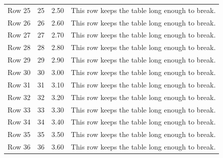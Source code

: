 \begin{tabularx}{\textwidth}{| l | c | r | L |}
	Row 25 & 25 & 2.50 & This row keeps the table long enough to break. \\
	Row 26 & 26 & 2.60 & This row keeps the table long enough to break. \\
	Row 27 & 27 & 2.70 & This row keeps the table long enough to break. \\
	Row 28 & 28 & 2.80 & This row keeps the table long enough to break. \\
	Row 29 & 29 & 2.90 & This row keeps the table long enough to break. \\
	Row 30 & 30 & 3.00 & This row keeps the table long enough to break. \\
	Row 31 & 31 & 3.10 & This row keeps the table long enough to break. \\
	Row 32 & 32 & 3.20 & This row keeps the table long enough to break. \\
	Row 33 & 33 & 3.30 & This row keeps the table long enough to break. \\
	Row 34 & 34 & 3.40 & This row keeps the table long enough to break. \\
	Row 35 & 35 & 3.50 & This row keeps the table long enough to break. \\
	Row 36 & 36 & 3.60 & This row keeps the table long enough to break. \\
\end{tabularx}
